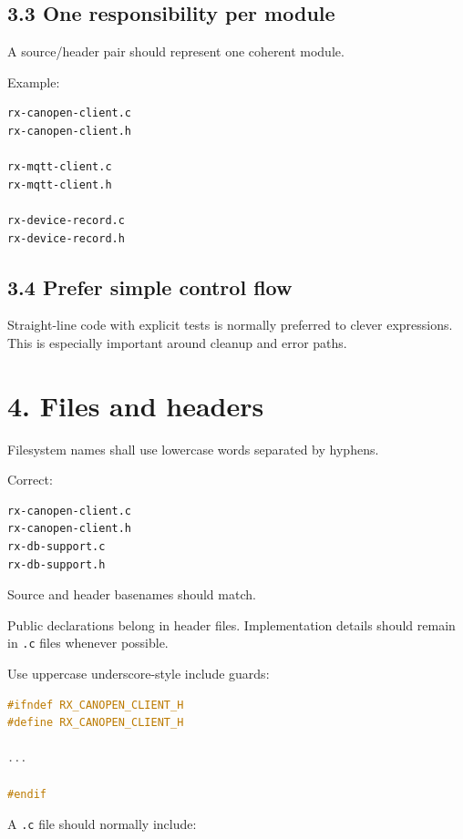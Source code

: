 \documentclass[11pt,a4paper]{article}
\begin{document}
\subsection{3.3 One responsibility per
module}\label{33-one-responsibility-per-module}

A source/header pair should represent one coherent module.

Example:

\begin{lstlisting}
rx-canopen-client.c
rx-canopen-client.h

rx-mqtt-client.c
rx-mqtt-client.h

rx-device-record.c
rx-device-record.h
\end{lstlisting}

\subsection{3.4 Prefer simple control
flow}\label{34-prefer-simple-control-flow}

Straight-line code with explicit tests is normally preferred to clever
expressions. This is especially important around cleanup and error
paths.

\section{4. Files and headers}\label{4-files-and-headers}

Filesystem names shall use lowercase words separated by hyphens.

Correct:

\begin{lstlisting}
rx-canopen-client.c
rx-canopen-client.h
rx-db-support.c
rx-db-support.h
\end{lstlisting}

Source and header basenames should match.

Public declarations belong in header files. Implementation details
should remain in \passthrough{\lstinline!.c!} files whenever possible.

Use uppercase underscore-style include guards:

\begin{lstlisting}[language=C]
#ifndef RX_CANOPEN_CLIENT_H
#define RX_CANOPEN_CLIENT_H

...

#endif
\end{lstlisting}

A \passthrough{\lstinline!.c!} file should normally include:
\end{document}
